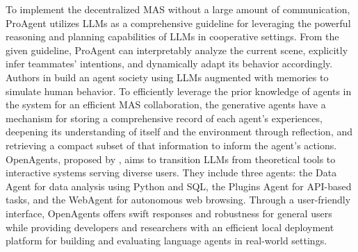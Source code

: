 \documentclass[acmsmall,nonacm]{acmart}
\begin{document}
        To implement the decentralized MAS without a large amount of communication, ProAgent \cite{Zhang_Yang_Hu_Wang_Li_Sun_Zhang_Zhang_Liu_Zhu_Chang_Zhang_Yin_Liang_Yang_2024} utilizes LLMs as a comprehensive guideline for leveraging the powerful reasoning and planning capabilities of LLMs in cooperative settings. From the given guideline, ProAgent can interpretably analyze the current scene, explicitly infer teammates' intentions, and dynamically adapt its behavior accordingly. 
        Authors in \cite{10.1145/3586183.3606763} build an agent society using LLMs augmented with memories to simulate human behavior. To efficiently leverage the prior knowledge of agents in the system for an efficient MAS collaboration, the generative agents have a mechanism for storing a comprehensive record of each agent's experiences, deepening its understanding of itself and the environment through reflection, and retrieving a compact subset of that information to inform the agent's actions.
        OpenAgents, proposed by \cite{xie2023openagentsopenplatformlanguage}, aims to transition LLMs from theoretical tools to interactive systems serving diverse users. They include three agents: the Data Agent for data analysis using Python and SQL, the Plugins Agent for API-based tasks, and the WebAgent for autonomous web browsing. Through a user-friendly interface, OpenAgents offers swift responses and robustness for general users while providing developers and researchers with an efficient local deployment platform for building and evaluating language agents in real-world settings.


\end{document}
